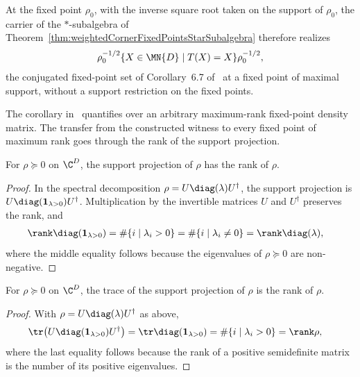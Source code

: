 At the fixed point $\rho_0$, with the inverse square root taken on the
support of $\rho_0$, the carrier of the $*$-subalgebra of
Theorem~\ref{thm:weightedCornerFixedPointsStarSubalgebra} therefore realizes
\begin{align}
    \rho_0^{-1/2}
    \{X\in\MN{D}\mid T(X)=X\}
    \rho_0^{-1/2},
    \notag
\end{align}
the conjugated fixed-point set of Corollary~6.7 of~\cite{Wolf2012Quantum}
at a fixed point of maximal support, without a support restriction on the
fixed points.

The corollary in~\cite{Wolf2012Quantum} quantifies over an arbitrary
maximum-rank fixed-point density matrix. The transfer from the constructed
witness to every fixed point of maximum rank goes through the rank of the
support projection.

\begin{lemma}%
    \label{lem:rank_stationaryProj}
    \leanok
    For $\rho\succeq0$ on $\C^D$, the support projection of $\rho$ has the
    rank of $\rho$.
\end{lemma}

\begin{proof}
    \leanok
    In the spectral decomposition
    $\rho=U\diag(\lambda)U^\dagger$, the support projection is
    $U\diag(\mathbf 1_{\lambda>0})U^\dagger$. Multiplication by the
    invertible matrices $U$ and $U^\dagger$ preserves the rank, and
    \begin{align}
        \rank\diag(\mathbf 1_{\lambda>0})
        &=\#\{i\mid\lambda_i>0\}
          =\#\{i\mid\lambda_i\neq0\}
          =\rank\diag(\lambda),
        \notag
    \end{align}
    where the middle equality follows because the eigenvalues of
    $\rho\succeq0$ are non-negative.
\end{proof}

\begin{lemma}%
    \label{lem:trace_stationaryProj}
    \leanok
    For $\rho\succeq0$ on $\C^D$, the trace of the support projection of
    $\rho$ is the rank of $\rho$.
\end{lemma}

\begin{proof}
    \leanok
    With $\rho=U\diag(\lambda)U^\dagger$ as above,
    \begin{align}
        \tr\!\left(U\diag(\mathbf 1_{\lambda>0})U^\dagger\right)
        &=\tr\diag(\mathbf 1_{\lambda>0})
          =\#\{i\mid\lambda_i>0\}
          =\rank\rho,
        \notag
    \end{align}
    where the last equality follows because the rank of a positive
    semidefinite matrix is the number of its positive eigenvalues.
\end{proof}

